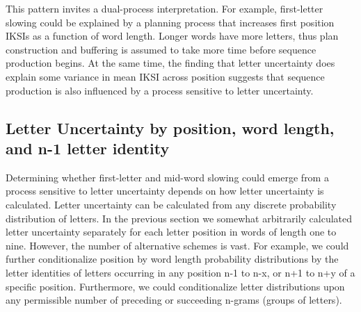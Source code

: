 \documentclass[,man,floatsintext]{apa6}
\begin{document}
This pattern invites a dual-process interpretation. For example, first-letter slowing could be explained by a planning process that increases first position IKSIs as a function of word length. Longer words have more letters, thus plan construction and buffering is assumed to take more time before sequence production begins. At the same time, the finding that letter uncertainty does explain some variance in mean IKSI across position suggests that sequence production is also influenced by a process sensitive to letter uncertainty.

\hypertarget{letter-uncertainty-by-position-word-length-and-n-1-letter-identity}{%
\subsection{Letter Uncertainty by position, word length, and n-1 letter identity}\label{letter-uncertainty-by-position-word-length-and-n-1-letter-identity}}

Determining whether first-letter and mid-word slowing could emerge from a process sensitive to letter uncertainty depends on how letter uncertainty is calculated. Letter uncertainty can be calculated from any discrete probability distribution of letters. In the previous section we somewhat arbitrarily calculated letter uncertainty separately for each letter position in words of length one to nine. However, the number of alternative schemes is vast. For example, we could further conditionalize position by word length probability distributions by the letter identities of letters occurring in any position n-1 to n-x, or n+1 to n+y of a specific position. Furthermore, we could conditionalize letter distributions upon any permissible number of preceding or succeeding n-grams (groups of letters).
\end{document}
